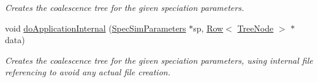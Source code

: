 \begin{DoxyCompactItemize}
\begin{DoxyCompactList}\small\item\em Creates the coalescence tree for the given speciation parameters. \end{DoxyCompactList}\item 
void \hyperlink{class_community_aee7488d02cccb897ed1d561e242391df}{do\+Application\+Internal} (\hyperlink{struct_spec_sim_parameters}{Spec\+Sim\+Parameters} $\ast$sp, \hyperlink{class_row}{Row}$<$ \hyperlink{class_tree_node}{Tree\+Node} $>$ $\ast$data)
\begin{DoxyCompactList}\small\item\em Creates the coalescence tree for the given speciation parameters, using internal file referencing to avoid any actual file creation. \end{DoxyCompactList}\end{DoxyCompactItemize}
